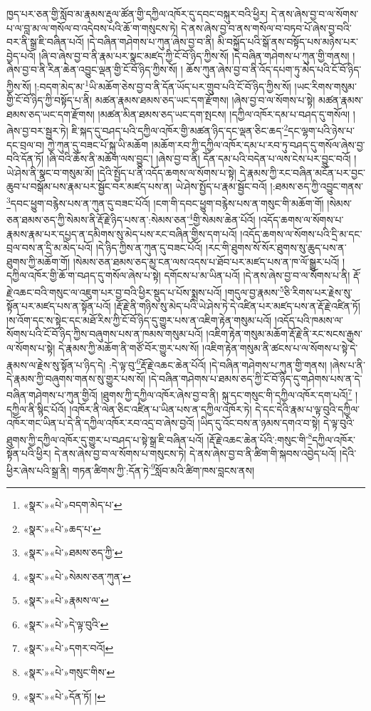 ཁྱད་པར་ཅན་གྱི་སློབ་མ་རྣམས་རྡུལ་ཚོན་གྱི་དཀྱིལ་འཁོར་དུ་དབང་བསྐུར་བའི་ཕྱིར། དེ་ནས་ཞེས་བྱ་བ་ལ་སོགས་པ་ལ་བླ་མ་ལ་གསོལ་བ་འདེབས་པའི་ཆོ་ག་གསུངས་ཏེ། དེ་ནས་ཞེས་བྱ་བ་ནས་གསོལ་བ་བཏབ་པོ་ཞེས་བྱ་བའི་བར་ནི་སྒྲ་ཇི་བཞིན་པའོ། །དེ་བཞིན་གཤེགས་པ་ཀུན་ཞེས་བྱ་བ་ནི། མི་བསྐྱོད་པའི་སྒོ་ནས་བསྟོད་པས་མཉེས་པར་བྱེད་པའོ། །ཞི་བ་ཞེས་བྱ་བ་ནི་རྣམ་པར་སྣང་མཛད་ཀྱི་ངོ་བོ་ཉིད་ཀྱིས་སོ། །དེ་བཞིན་གཤེགས་པ་ཀུན་གྱི་གནས། །ཞེས་བྱ་བ་ནི་རིན་ཆེན་འབྱུང་ལྡན་གྱི་ངོ་བོ་ཉིད་ཀྱིས་སོ། །
ཆོས་ཀུན་ཞེས་བྱ་བ་ནི་འོད་དཔག་ཏུ་མེད་པའི་ངོ་བོ་ཉིད་ཀྱིས་སོ། །:བདག་མེད་མ་\footnote{«སྣར་»«པེ་»བདག་མེད་པ་}ཡི་མཆོག་ཅེས་བྱ་བ་ནི་དོན་ཡོད་པར་གྲུབ་པའི་ངོ་བོ་ཉིད་ཀྱིས་སོ། །ཡང་རིགས་གསུམ་གྱི་ངོ་བོ་ཉིད་ཀྱི་བསྟོད་པ་ནི། མཚན་རྣམས་ཐམས་ཅད་ཡང་དག་རྫོགས། །ཞེས་བྱ་བ་ལ་སོགས་པ་སྟེ། མཚན་རྣམས་ཐམས་ཅད་ཡང་དག་རྫོགས། །མཚན་མིན་ཐམས་ཅད་ཡང་དག་སྤངས། །དཀྱིལ་འཁོར་དམ་པ་བཤད་དུ་གསོལ། །ཞེས་བྱ་བར་སྦྱར་ཏེ། ཇི་སྐད་དུ་བཤད་པའི་དཀྱིལ་འཁོར་གྱི་མཚན་ཉིད་དང་ལྡན་ཅིང་ཆད་\footnote{«སྣར་»«པེ་»ཆད་པ་}དང་ལྷག་པའི་ཉེས་པ་དང་བྲལ་བ། ཀྱེ་ཀུན་དུ་བཟང་པོ་སྐུ་ཡི་མཆོག །མཆོག་རབ་ཀྱི་དཀྱིལ་འཁོར་དམ་པ་རབ་ཏུ་བཤད་དུ་གསོལ་ཞེས་བྱ་བའི་དོན་ཏོ། །ཞི་བའི་ཆོས་ནི་མཆོག་ལས་བྱུང་། །ཞེས་བྱ་བ་ནི། དོན་དམ་པའི་བདེན་པ་ལས་ངེས་པར་བྱུང་བའོ། །ཡེ་ཤེས་ནི་སྣང་བ་གསུམ་མོ། །དེའི་སྤྱོད་པ་ནི་འདོད་ཆགས་ལ་སོགས་པ་སྟེ། དེ་རྣམས་ཀྱི་རང་བཞིན་མངོན་པར་བྱང་ཆུབ་པ་བསྒོམ་པས་རྣམ་པར་སྦྱོང་བར་མཛད་པས་ན། ཡེ་ཤེས་སྤྱོད་པ་རྣམ་སྦྱོང་བའོ། །:ཐམས་ཅད་ཀྱི་འབྱུང་གནས་\footnote{«སྣར་»«པེ་»ཐམས་ཅད་ཀྱི་}དབང་ཕྱུག་བརྙེས་པས་ན་ཀུན་དུ་བཟང་པོའོ། །ངག་གི་དབང་ཕྱུག་བརྙེས་པས་ན་གསུང་གི་མཆོག་གོ། །སེམས་ཅན་ཐམས་ཅད་ཀྱི་སེམས་ནི་རྡོ་རྗེ་ཉིད་པས་ན་:སེམས་ཅན་\footnote{«སྣར་»«པེ་»སེམས་ཅན་ཀུན་}གྱི་སེམས་ཆེན་པོའོ། །འདོད་ཆགས་ལ་སོགས་པ་རྣམས་རྣམ་པར་དཔྱད་ན་དམིགས་སུ་མེད་པས་རང་བཞིན་གྱིས་དག་པའོ། །འདོད་ཆགས་ལ་སོགས་པའི་དྲི་མ་དང་བྲལ་བས་ན་དྲི་མ་མེད་པའོ། །དེ་ཉིད་ཀྱིས་ན་ཀུན་དུ་བཟང་པོའོ། །རང་གི་ཐུགས་སོ་སོར་ཐུགས་སུ་ཆུད་པས་ན་ཐུགས་ཀྱི་མཆོག་གོ། །སེམས་ཅན་ཐམས་ཅད་མྱ་ངན་ལས་འདས་པ་ཐོབ་པར་མཛད་པས་ན་ཁ་ལོ་སྒྱུར་པའོ། །དཀྱིལ་འཁོར་གྱི་ཆོ་ག་བཤད་དུ་གསོལ་ཞེས་པ་སྟེ། དགོངས་པ་མ་ཡིན་པའོ། །དེ་ནས་ཞེས་བྱ་བ་ལ་སོགས་པ་ནི། རྡོ་རྗེ་འཆང་བའི་གསུང་ལ་འཇུག་པར་བྱ་བའི་ཕྱིར་སྡུད་པ་པོས་སྨྲས་པའོ། །གདུལ་བྱ་རྣམས་\footnote{«སྣར་»«པེ་»རྣམས་ལ་}ཅི་རིགས་པར་རྗེས་སུ་སྟོན་པར་མཛད་པས་ན་སྟོན་པའོ། །རྡོ་རྗེ་ནི་གཉིས་སུ་མེད་པའི་ཡེ་ཤེས་ཏེ་དེ་འཛིན་པར་མཛད་པས་ན་རྡོ་རྗེ་འཛིན་ཏོ། །ས་འོག་དང་ས་སྟེང་དང་མཐོ་རིས་ཀྱི་ངོ་བོ་ཉིད་དུ་གྱུར་པས་ན་འཇིག་རྟེན་གསུམ་པའོ། །འདོད་པའི་ཁམས་ལ་སོགས་པའི་ངོ་བོ་ཉིད་ཀྱིས་བཞུགས་པས་ན་ཁམས་གསུམ་པའོ། །འཇིག་རྟེན་གསུམ་མཆོག་རྡོ་རྗེ་ནི་རང་སངས་རྒྱས་ལ་སོགས་པ་སྟེ། དེ་རྣམས་ཀྱི་མཆོག་ནི་གཙོ་བོར་གྱུར་པས་སོ། །འཇིག་རྟེན་གསུམ་ནི་ཚངས་པ་ལ་སོགས་པ་སྟེ་དེ་རྣམས་ལ་རྗེས་སུ་སྟོན་པ་ཉིད་དེ། :དེ་ལྟ་བུ་\footnote{«སྣར་»«པེ་»དེ་ལྟ་བུའི་}རྡོ་རྗེ་འཆང་ཆེན་པོའོ། །དེ་བཞིན་གཤེགས་པ་ཀུན་གྱི་གནས། །ཞེས་པ་ནི་དེ་རྣམས་ཀྱི་བཞུགས་གནས་སུ་གྱུར་པས་སོ། །དེ་བཞིན་གཤེགས་པ་ཐམས་ཅད་ཀྱི་ངོ་བོ་ཉིད་དུ་གཤེགས་པས་ན་དེ་བཞིན་གཤེགས་པ་ཀུན་གྱིའོ། །ཐུགས་ཀྱི་དཀྱིལ་འཁོར་ཞེས་བྱ་བ་ནི། སྐུ་དང་གསུང་གི་དཀྱིལ་འཁོར་དག་པའོ།\footnote{«སྣར་»«པེ་»དགར་བའོ།} །དཀྱིལ་ནི་སྙིང་པོའོ། །འཁོར་ནི་ལེན་ཅིང་འཛིན་པ་ཡིན་པས་ན་དཀྱིལ་འཁོར་ཏེ། དེ་དང་དེའི་རྣམ་པ་ལྟ་བུའི་དཀྱིལ་འཁོར་གང་ཡིན་པ་དེ་ནི་དཀྱིལ་འཁོར་རབ་འདྲ་བ་ཞེས་བྱའོ། །ཡིད་དུ་འོང་བས་ན་ཉམས་དགའ་བ་སྟེ། དེ་ལྟ་བུའི་ཐུགས་ཀྱི་དཀྱིལ་འཁོར་དུ་གྱུར་པ་བཤད་པ་སྟེ་སྒྲ་ཇི་བཞིན་པའོ། །རྡོ་རྗེ་འཆང་ཆེན་པོའི་:གསུང་གི་\footnote{«སྣར་»«པེ་»གསུང་གིས་}དཀྱིལ་འཁོར་སྟོན་པའི་ཕྱིར། དེ་ནས་ཞེས་བྱ་བ་ལ་སོགས་པ་གསུངས་ཏེ། དེ་ནས་ཞེས་བྱ་བ་ནི་ཚིག་གི་སྐབས་འབྱེད་པའོ། །དེའི་ཕྱིར་ཞེས་པའི་སྒྲ་ནི། གཏན་ཚིགས་ཀྱི་:དོན་ཏེ་\footnote{«སྣར་»«པེ་»དོན་ཏོ། །}སློབ་མའི་ཚིག་ཁས་བླངས་ནས། 
